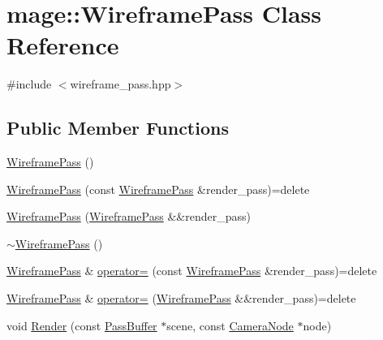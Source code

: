 \hypertarget{classmage_1_1_wireframe_pass}{}\section{mage\+:\+:Wireframe\+Pass Class Reference}
\label{classmage_1_1_wireframe_pass}


{\ttfamily \#include $<$wireframe\+\_\+pass.\+hpp$>$}

\subsection*{Public Member Functions}
\begin{DoxyCompactItemize}
\item 
\hyperlink{classmage_1_1_wireframe_pass_a7323b3caca5d06a068a89c0333651f04}{Wireframe\+Pass} ()
\item 
\hyperlink{classmage_1_1_wireframe_pass_a3e070108925c2ef3b4feaa29dbf605f2}{Wireframe\+Pass} (const \hyperlink{classmage_1_1_wireframe_pass}{Wireframe\+Pass} \&render\+\_\+pass)=delete
\item 
\hyperlink{classmage_1_1_wireframe_pass_a08631bc9b341bed85b1b14b99affb1f0}{Wireframe\+Pass} (\hyperlink{classmage_1_1_wireframe_pass}{Wireframe\+Pass} \&\&render\+\_\+pass)
\item 
\hyperlink{classmage_1_1_wireframe_pass_a186e4dd37ac17382872180385ec4dca1}{$\sim$\+Wireframe\+Pass} ()
\item 
\hyperlink{classmage_1_1_wireframe_pass}{Wireframe\+Pass} \& \hyperlink{classmage_1_1_wireframe_pass_a57da0b468c68c8653ebc639923b111ba}{operator=} (const \hyperlink{classmage_1_1_wireframe_pass}{Wireframe\+Pass} \&render\+\_\+pass)=delete
\item 
\hyperlink{classmage_1_1_wireframe_pass}{Wireframe\+Pass} \& \hyperlink{classmage_1_1_wireframe_pass_abd90640d63b9ce0c44b87de87d06910c}{operator=} (\hyperlink{classmage_1_1_wireframe_pass}{Wireframe\+Pass} \&\&render\+\_\+pass)=delete
\item 
void \hyperlink{classmage_1_1_wireframe_pass_a75135a847466cccd034d9a0c71338cf2}{Render} (const \hyperlink{structmage_1_1_pass_buffer}{Pass\+Buffer} $\ast$scene, const \hyperlink{classmage_1_1_camera_node}{Camera\+Node} $\ast$node)
\end{DoxyCompactItemize}
